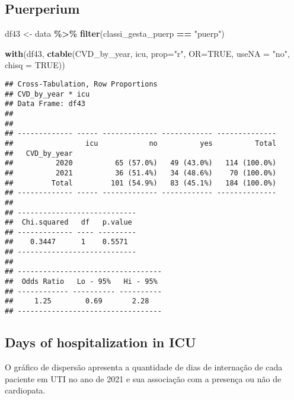 \documentclass[
]{article}
\newenvironment{Shaded}{\begin{snugshade}}{\end{snugshade}}
\newcommand{\AttributeTok}[1]{\textcolor[rgb]{0.13,0.29,0.53}{#1}}
\newcommand{\ConstantTok}[1]{\textcolor[rgb]{0.56,0.35,0.01}{#1}}
\newcommand{\FunctionTok}[1]{\textcolor[rgb]{0.13,0.29,0.53}{\textbf{#1}}}
\newcommand{\NormalTok}[1]{#1}
\newcommand{\OtherTok}[1]{\textcolor[rgb]{0.56,0.35,0.01}{#1}}
\newcommand{\SpecialCharTok}[1]{\textcolor[rgb]{0.81,0.36,0.00}{\textbf{#1}}}
\newcommand{\StringTok}[1]{\textcolor[rgb]{0.31,0.60,0.02}{#1}}
\begin{document}
\hypertarget{puerperium-6}{%
\subsection{Puerperium}\label{puerperium-6}}

\begin{Shaded}
\begin{Highlighting}[]
\NormalTok{df43 }\OtherTok{\textless{}{-}}\NormalTok{ data }\SpecialCharTok{\%\textgreater{}\%} 
  \FunctionTok{filter}\NormalTok{(classi\_gesta\_puerp }\SpecialCharTok{==} \StringTok{"puerp"}\NormalTok{)}

\FunctionTok{with}\NormalTok{(df43, }\FunctionTok{ctable}\NormalTok{(CVD\_by\_year, icu, }\AttributeTok{prop=}\StringTok{"r"}\NormalTok{, }\AttributeTok{OR=}\ConstantTok{TRUE}\NormalTok{, }\AttributeTok{useNA =} \StringTok{"no"}\NormalTok{, }\AttributeTok{chisq =} \ConstantTok{TRUE}\NormalTok{))}
\end{Highlighting}
\end{Shaded}

\begin{verbatim}
## Cross-Tabulation, Row Proportions  
## CVD_by_year * icu  
## Data Frame: df43  
## 
## 
## ------------- ----- ------------- ------------ --------------
##                 icu            no          yes          Total
##   CVD_by_year                                                
##          2020          65 (57.0%)   49 (43.0%)   114 (100.0%)
##          2021          36 (51.4%)   34 (48.6%)    70 (100.0%)
##         Total         101 (54.9%)   83 (45.1%)   184 (100.0%)
## ------------- ----- ------------- ------------ --------------
## 
## ----------------------------
##  Chi.squared   df   p.value 
## ------------- ---- ---------
##    0.3447      1    0.5571  
## ----------------------------
## 
## ----------------------------------
##  Odds Ratio   Lo - 95%   Hi - 95% 
## ------------ ---------- ----------
##     1.25        0.69       2.28   
## ----------------------------------
\end{verbatim}

\hypertarget{days-of-hospitalization-in-icu}{%
\subsection{Days of hospitalization in
ICU}\label{days-of-hospitalization-in-icu}}

O gráfico de dispersão apresenta a quantidade de dias de internação de
cada paciente em UTI no ano de 2021 e sua associação com a presença ou
não de cardiopata.
\end{document}
